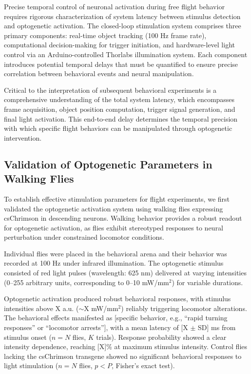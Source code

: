 \documentclass[../main/thesis_msc.tex]{subfiles}
\begin{document}
Precise temporal control of neuronal activation during free flight behavior requires rigorous characterization of system latency between stimulus detection and optogenetic activation. The closed-loop stimulation system comprises three primary components: real-time object tracking (100 Hz frame rate), computational decision-making for trigger initiation, and hardware-level light control via an Arduino-controlled Thorlabs illumination system. Each component introduces potential temporal delays that must be quantified to ensure precise correlation between behavioral events and neural manipulation.

Critical to the interpretation of subsequent behavioral experiments is a comprehensive understanding of the total system latency, which encompasses frame acquisition, object position computation, trigger signal generation, and final light activation. This end-to-end delay determines the temporal precision with which specific flight behaviors can be manipulated through optogenetic intervention.

\subsection{Validation of Optogenetic Parameters in Walking Flies}

To establish effective stimulation parameters for flight experiments, we first validated the optogenetic activation system using walking flies expressing csChrimson in descending neurons. Walking behavior provides a robust readout for optogenetic activation, as flies exhibit stereotyped responses to neural perturbation under constrained locomotor conditions.

Individual flies were placed in the behavioral arena and their behavior was recorded at 100 Hz under infrared illumination. The optogenetic stimulus consisted of red light pulses (wavelength: 625 nm) delivered at varying intensities (0--255 arbitrary units, corresponding to 0--10 mW/mm$^2$) for variable durations.

Optogenetic activation produced robust behavioral responses, with stimulus intensities above X a.u. ($\sim$X mW/mm$^2$) reliably triggering locomotor alterations. The behavioral effects manifested as [specific behavior, e.g., ``rapid turning responses'' or ``locomotor arrests''], with a mean latency of [X $\pm$ SD] ms from stimulus onset ($n = N$ flies, $K$ trials). Response probability showed a clear intensity dependence, reaching [X]\% at maximum stimulus intensity. Control flies lacking the csChrimson transgene showed no significant behavioral responses to light stimulation ($n = N$ flies, $p < P$, Fisher's exact test).
\end{document}
